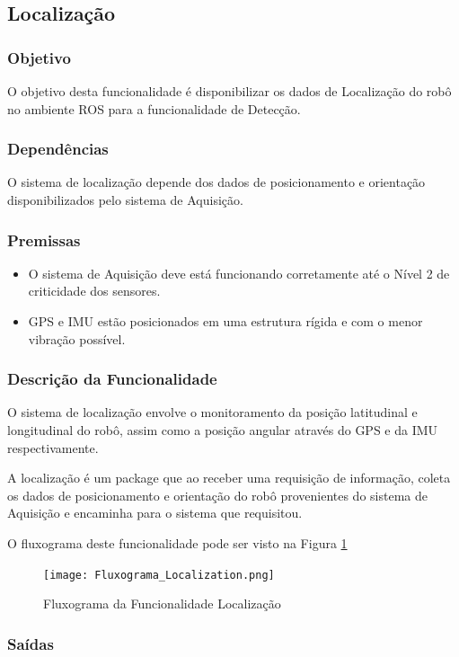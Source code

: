 \subsection{Localização}
\label{ssec:func2}
\subsubsection{Objetivo}
O objetivo desta funcionalidade é disponibilizar os dados de Localização do robô no ambiente ROS para a funcionalidade de Detecção.

\subsubsection{Dependências}
O sistema de localização depende dos dados de posicionamento e orientação disponibilizados pelo sistema de Aquisição.

\subsubsection{Premissas}
\begin{itemize}
	\item O sistema de Aquisição deve está funcionando corretamente até o Nível 2 de criticidade dos sensores.
	\item GPS e IMU estão posicionados em uma estrutura rígida e com o menor vibração possível.
\end{itemize}

\subsubsection{Descrição da Funcionalidade}
O sistema de localização envolve o monitoramento da posição latitudinal e longitudinal do robô, assim como a posição angular através do GPS e da IMU respectivamente.

A localização é um package que ao receber uma requisição de informação, coleta os dados de posicionamento e orientação do robô provenientes do sistema de Aquisição e encaminha para o sistema que requisitou.

O fluxograma deste funcionalidade pode ser visto na Figura \ref{fluxlocal}

\begin{figure}[h!]
	\centering
	\texttt{[image: Fluxograma\_Localization.png]}
	\caption{Fluxograma da Funcionalidade Localização} \label{fluxlocal}
\end{figure}
\pagebreak
\subsubsection{Saídas}

